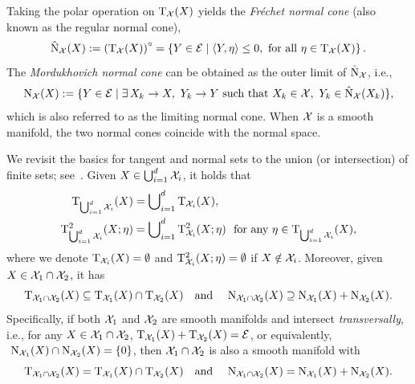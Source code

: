 Taking the polar operation on $\mathrm{T}_{\mathcal{X}}(X)$ yields the \emph{Fr\'echet normal cone} (also known as the regular normal cone), 
\begin{equation*}
\hat{\mathrm{N}}_{\mathcal{X}}(X):=\left( {\mathrm{T}_{\mathcal{X}}(X)} \right)^\circ = \left\{ { Y\in\mathcal{E} \mid \langle Y, \eta\rangle \le 0, \ \text{for all}\ \eta \in \mathrm{T}_{\mathcal{X}}(X)} \right\}.
\end{equation*}
The \emph{Mordukhovich normal cone} can be obtained as the outer limit of $\hat{\mathrm{N}}_{\mathcal{X}}$, i.e.,
\begin{equation}\label{eq:liminting_normalcone}
\begin{aligned}
    \Lnormal_\xanifold(X) := \{Y\in\eanifold\mid\exists\,X_k\rightarrow X,\  Y_k\rightarrow Y\ \text{such that}\ X_k\in\xanifold,\ Y_k\in\Fnormal_{\xanifold}(X_k)\},
\end{aligned}
\end{equation}
which is also referred to as the limiting normal cone. When $\mathcal{X}$ is a smooth manifold, the two normal cones coincide with the normal space. 



We revisit the basics for tangent and normal sets to the union (or intersection) of finite sets; see~\cite{rockafellar2009variationalanalysis,lee2012manifolds}. Given $X\in\bigcup_{i=1}^d{\mathcal{X}_i}$, it holds that
\begin{equation}\label{eq:tangentcupXi}
    \begin{aligned}
        \tangent_{\bigcup\nolimits_{i=1}^d{\xanifold_i}}(X) &=  \bigcup\nolimits_{i=1}^d \Btangent_{\xanifold_i}(X),
        \\
        \tangenttwo_{\bigcup\nolimits_{i=1}^d{\xanifold_i}}(X;\eta) &=  \bigcup\nolimits_{i=1}^d \tangenttwo_{\xanifold_i}(X;\eta)\ \ \text{for any}\ \eta\in\tangent_{\bigcup\nolimits_{i=1}^d{\xanifold_i}}(X),
    \end{aligned}
\end{equation}
where we denote $\mathrm{T}_{\mathcal{X}_i}(X)=\emptyset$ and $\mathrm{T}^2_{\mathcal{X}_i}(X;\eta)=\emptyset$ if $X\notin\mathcal{X}_i$. Moreover, given $X\in \mathcal{X}_1\cap \mathcal{X}_2$, {it has}
\begin{equation}\label{eq:cone_oneside}
    \Btangent_{\xanifold_1\cap \xanifold_2}(X) \subseteq  \Btangent_{\xanifold_1}(X) \cap \Btangent_{\xanifold_2}(X)\quad \text{and} \quad\ 
    \normal_{\xanifold_1\cap \xanifold_2}(X) \supseteq \normal_{\xanifold_1}(X) + \normal_{\xanifold_2}(X).
\end{equation}
Specifically, if both $\mathcal{X}_1$ and $\mathcal{X}_2$ are smooth manifolds and intersect \emph{transversally}, i.e., for any $X\in\mathcal{X}_1\cap\mathcal{X}_2$, $\mathrm{T}_{\mathcal{X}_1}(X) + \mathrm{T}_{\mathcal{X}_2}(X) = \mathcal{E}$,  or equivalently, $\ \mathrm{N}_{\mathcal{X}_1}(X)\cap \mathrm{N}_{\mathcal{X}_2}(X) = \{0\}$, then $\mathcal{X}_1\cap \mathcal{X}_2$ is also a smooth manifold with
\begin{equation}\label{eq:cone_tranverse}
    \Btangent_{\xanifold_1\cap \xanifold_2}(X) = \Btangent_{\xanifold_1}(X) \cap \Btangent_{\xanifold_2}(X)\quad \text{and} \quad\ 
    \normal_{\xanifold_1\cap \xanifold_2}(X) = \normal_{\xanifold_1}(X) + \normal_{\xanifold_2}(X).
\end{equation}


